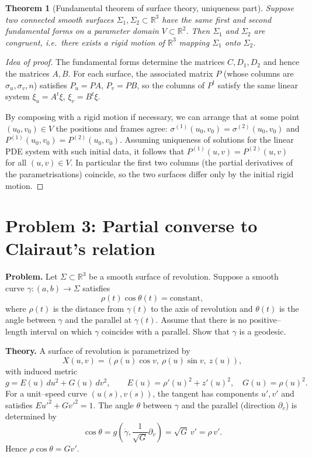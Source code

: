 \documentclass[12pt,a4paper]{article}
\theoremstyle{plain}
\newtheorem{theorem}{Theorem}[section]
\theoremstyle{definition}      %
\begin{document}
\begin{theorem}[Fundamental theorem of surface theory, uniqueness part]
	Suppose two connected smooth surfaces $\Sigma_1,\Sigma_2\subset
	\mathbb{R}^3$ have the same first and second fundamental forms on a
	parameter domain $V\subset\mathbb{R}^2$.  Then $\Sigma_1$ and $\Sigma_2$
	are congruent, i.e.\ there exists a rigid motion of $\mathbb{R}^3$
	mapping $\Sigma_1$ onto $\Sigma_2$.
\end{theorem}

\begin{proof}[Idea of proof]
	The fundamental forms determine the matrices $C,D_1,D_2$ and hence the
	matrices $A,B$.  For each surface, the associated matrix $P$ (whose
	columns are $\sigma_u,\sigma_v,n$) satisfies $P_u=PA$, $P_v=PB$, so the
	columns of $P^t$ satisfy the same linear system
	$\xi_u=A^t\xi$, $\xi_v=B^t\xi$.
	
	By composing with a rigid motion if necessary, we can arrange that at
	some point $(u_0,v_0)\in V$ the positions and frames agree:
	$\sigma^{(1)}(u_0,v_0)=\sigma^{(2)}(u_0,v_0)$ and
	$P^{(1)}(u_0,v_0)=P^{(2)}(u_0,v_0)$.  Assuming uniqueness of solutions
	for the linear PDE system with such initial data, it follows that
	$P^{(1)}(u,v)=P^{(2)}(u,v)$ for all $(u,v)\in V$.  In particular the
	first two columns (the partial derivatives of the parametrisations)
	coincide, so the two surfaces differ only by the initial rigid motion.
\end{proof}


\section*{Problem 3: Partial converse to Clairaut's relation}

\textbf{Problem.}
Let $\Sigma\subset\mathbb R^3$ be a smooth surface of revolution.
Suppose a smooth curve $\gamma:(a,b)\to\Sigma$ satisfies
\[
\rho(t)\cos\theta(t)=\text{constant},
\]
where $\rho(t)$ is the distance from $\gamma(t)$ to the axis of revolution
and $\theta(t)$ is the angle between $\gamma$ and the parallel at $\gamma(t)$.
Assume that there is no positive--length interval on which $\gamma$ coincides
with a parallel. Show that $\gamma$ is a geodesic.

\medskip
\textbf{Theory.}
A surface of revolution is parametrized by
\[
X(u,v) = (\rho(u)\cos v,\ \rho(u)\sin v,\ z(u)),
\]
with induced metric
\[
g = E(u)\,du^2 + G(u)\,dv^2,\qquad
E(u)=\rho'(u)^2+z'(u)^2,\quad G(u)=\rho(u)^2.
\]
For a unit--speed curve $(u(s),v(s))$, the tangent has components
$u',v'$ and satisfies $E u'^2 + G v'^2 = 1$. The angle $\theta$ between
$\gamma$ and the parallel (direction $\partial_v$) is determined by
\[
\cos\theta = g\!\left(\dot\gamma,\frac{1}{\sqrt{G}}\partial_v\right)
= \sqrt{G}\,v' = \rho\,v'.
\]
Hence $\rho\cos\theta = G v'$.
\end{document}
